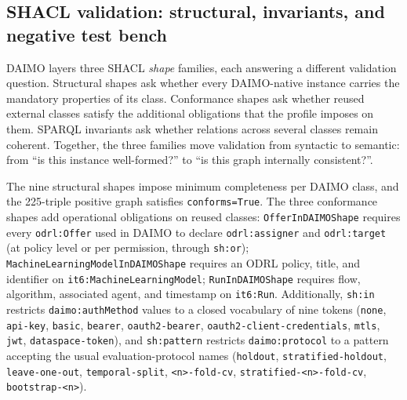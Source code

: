 \documentclass[Afour,sagev,times]{sagej}
\newcommand{\code}[1]{\texttt{#1}}
\begin{document}
\subsection{SHACL validation: structural, invariants, and negative test bench}\label{sec:eval-invariants}

DAIMO layers three SHACL \emph{shape} families, each answering a different validation question. Structural shapes ask whether every DAIMO-native instance carries the mandatory properties of its class. Conformance shapes ask whether reused external classes satisfy the additional obligations that the profile imposes on them. SPARQL invariants ask whether relations across several classes remain coherent. Together, the three families move validation from syntactic to semantic: from ``is this instance well-formed?'' to ``is this graph internally consistent?''.

The nine structural shapes impose minimum completeness per DAIMO class, and the 225-triple positive graph satisfies \code{conforms=True}. The three conformance shapes add operational obligations on reused classes: \code{OfferInDAIMOShape} requires every \code{odrl:Offer} used in DAIMO to declare \code{odrl:assigner} and \code{odrl:target} (at policy level or per permission, through \code{sh:or}); \code{MachineLearningModelInDAIMOShape} requires an ODRL policy, title, and identifier on \code{it6:MachineLearningModel}; \code{RunInDAIMOShape} requires flow, algorithm, associated agent, and timestamp on \code{it6:Run}. Additionally, \code{sh:in} restricts \code{daimo:authMethod} values to a closed vocabulary of nine tokens (\code{none}, \code{api-key}, \code{basic}, \code{bearer}, \code{oauth2-bearer}, \code{oauth2-client-credentials}, \code{mtls}, \code{jwt}, \code{dataspace-token}), and \code{sh:pattern} restricts \code{daimo:protocol} to a pattern accepting the usual evaluation-protocol names (\code{holdout}, \code{stratified-holdout}, \code{leave-one-out}, \code{temporal-split}, \code{<n>-fold-cv}, \code{stratified-<n>-fold-cv}, \code{bootstrap-<n>}).
\end{document}

